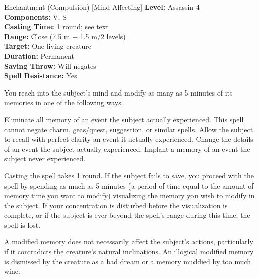 {Enchantment (Compulsion) [Mind-Affecting]}
{
	\textbf{Level:}
	Assassin 4\\
	\textbf{Components:}
	V, S\\
	\textbf{Casting Time:}
	1 round; see text\\
	\textbf{Range:}
	Close (7.5 m + 1.5 m/2 levels)\\
	\textbf{Target:}
	One living creature\\
	\textbf{Duration:}
	Permanent\\
	\textbf{Saving Throw:}
	Will negates\\
	\textbf{Spell Resistance:}
	Yes\\
}
{
	You reach into the subject's mind and modify as many as 5 minutes of its memories in one of the following ways.


Eliminate all memory of an event the subject actually experienced. This spell cannot negate charm, geas/quest, suggestion, or similar spells.
Allow the subject to recall with perfect clarity an event it actually experienced.
Change the details of an event the subject actually experienced.
Implant a memory of an event the subject never experienced.

	Casting the spell takes 1 round. If the subject fails to save, you proceed with the spell by spending as much as 5 minutes (a period of time equal to the amount of memory time you want to modify) visualizing the memory you wish to modify in the subject. If your concentration is disturbed before the visualization is complete, or if the subject is ever beyond the spell's range during this time, the spell is lost.

	A modified memory does not necessarily affect the subject's actions, particularly if it contradicts the creature's natural inclinations. An illogical modified memory is dismissed by the creature as a bad dream or a memory muddied by too much wine.

}
